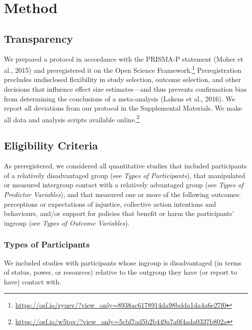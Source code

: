 \documentclass[twocolumn, 11pt, letterpaper]{article}
\begin{document}
\hypertarget{method}{%
\section{Method}\label{method}}

\hypertarget{transparency}{%
\subsection{Transparency}\label{transparency}}

We prepared a protocol in accordance with the PRISMA-P statement (Moher
et al., 2015) and preregistered it on the Open Science
Framework.\footnote{\url{https://osf.io/ryuev/?view_only=8938ac6178914da98bdda1da4a6e27f0}}
Preregistration precludes undisclosed flexibility in study selection,
outcome selection, and other decisions that influence effect size
estimates---and thus prevents confirmation bias from determining the
conclusions of a meta-analysis (Lakens et al., 2016). We report all
deviations from our protocol in the Supplemental Materials. We make all
data and analysis scripts available online.\footnote{\url{https://osf.io/w5tqv/?view_only=5cbf7ad5b2b449a7a0f4ada0337b802a}}

\hypertarget{eligibility-criteria}{%
\subsection{Eligibility Criteria}\label{eligibility-criteria}}

As preregistered, we considered all quantitative studies that included
participants of a relatively disadvantaged group (see \emph{Types of
Participants}), that manipulated or measured intergroup contact with a
relatively advantaged group (see \emph{Types of Predictor Variables}),
and that measured one or more of the following outcomes: perceptions or
expectations of injustice, collective action intentions and behaviours,
and/or support for policies that benefit or harm the participants'
ingroup (see \emph{Types of Outcome Variables}).

\hypertarget{types-of-participants}{%
\subsubsection{Types of Participants}\label{types-of-participants}}

We included studies with participants whose ingroup is disadvantaged (in
terms of status, power, or resources) relative to the outgroup they have
(or report to have) contact with.
\end{document}
